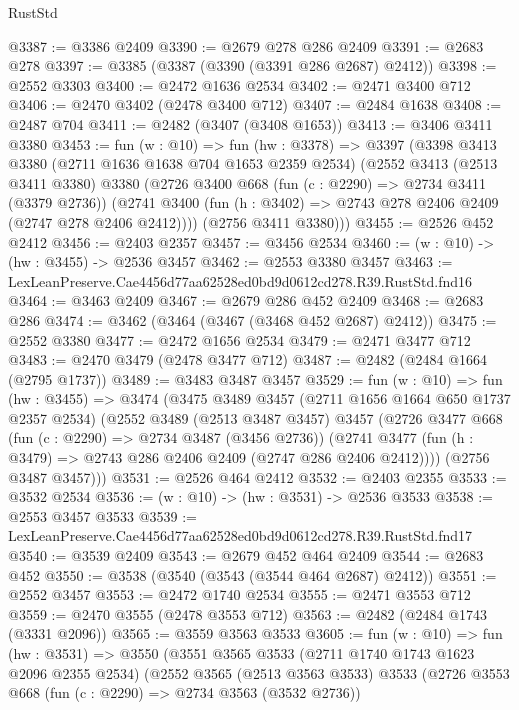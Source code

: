 \begin{lexlean}{RustStd}
\begin{coremodule}
@3387 := @3386 @2409
@3390 := @2679 @278 @286 @2409
@3391 := @2683 @278
@3397 := @3385 (@3387 (@3390 (@3391 @286 @2687) @2412))
@3398 := @2552 @3303
@3400 := @2472 @1636 @2534
@3402 := @2471 @3400 @712
@3406 := @2470 @3402 (@2478 @3400 @712)
@3407 := @2484 @1638
@3408 := @2487 @704
@3411 := @2482 (@3407 (@3408 @1653))
@3413 := @3406 @3411 @3380
@3453 := fun (w : @10) =>
  fun (hw : @3378) =>
  @3397
    (@3398
      @3413
      @3380
      (@2711 @1636 @1638 @704 @1653 @2359 @2534)
      (@2552
        @3413
        (@2513 @3411 @3380)
        @3380
        (@2726
          @3400
          @668
          (fun (c : @2290) => @2734 @3411 (@3379 @2736))
          (@2741 @3400 (fun (h : @3402) => @2743 @278 @2406 @2409 (@2747 @278 @2406 @2412))))
        (@2756 @3411 @3380)))
@3455 := @2526 @452 @2412
@3456 := @2403 @2357
@3457 := @3456 @2534
@3460 := (w : @10) -> (hw : @3455) -> @2536 @3457
@3462 := @2553 @3380 @3457
@3463 := LexLeanPreserve.Cae4456d77aa62528ed0bd9d0612cd278.R39.RustStd.fnd16
@3464 := @3463 @2409
@3467 := @2679 @286 @452 @2409
@3468 := @2683 @286
@3474 := @3462 (@3464 (@3467 (@3468 @452 @2687) @2412))
@3475 := @2552 @3380
@3477 := @2472 @1656 @2534
@3479 := @2471 @3477 @712
@3483 := @2470 @3479 (@2478 @3477 @712)
@3487 := @2482 (@2484 @1664 (@2795 @1737))
@3489 := @3483 @3487 @3457
@3529 := fun (w : @10) =>
  fun (hw : @3455) =>
  @3474
    (@3475
      @3489
      @3457
      (@2711 @1656 @1664 @650 @1737 @2357 @2534)
      (@2552
        @3489
        (@2513 @3487 @3457)
        @3457
        (@2726
          @3477
          @668
          (fun (c : @2290) => @2734 @3487 (@3456 @2736))
          (@2741 @3477 (fun (h : @3479) => @2743 @286 @2406 @2409 (@2747 @286 @2406 @2412))))
        (@2756 @3487 @3457)))
@3531 := @2526 @464 @2412
@3532 := @2403 @2355
@3533 := @3532 @2534
@3536 := (w : @10) -> (hw : @3531) -> @2536 @3533
@3538 := @2553 @3457 @3533
@3539 := LexLeanPreserve.Cae4456d77aa62528ed0bd9d0612cd278.R39.RustStd.fnd17
@3540 := @3539 @2409
@3543 := @2679 @452 @464 @2409
@3544 := @2683 @452
@3550 := @3538 (@3540 (@3543 (@3544 @464 @2687) @2412))
@3551 := @2552 @3457
@3553 := @2472 @1740 @2534
@3555 := @2471 @3553 @712
@3559 := @2470 @3555 (@2478 @3553 @712)
@3563 := @2482 (@2484 @1743 (@3331 @2096))
@3565 := @3559 @3563 @3533
@3605 := fun (w : @10) =>
  fun (hw : @3531) =>
  @3550
    (@3551
      @3565
      @3533
      (@2711 @1740 @1743 @1623 @2096 @2355 @2534)
      (@2552
        @3565
        (@2513 @3563 @3533)
        @3533
        (@2726
          @3553
          @668
          (fun (c : @2290) => @2734 @3563 (@3532 @2736))

\end{coremodule}
\end{lexlean}
